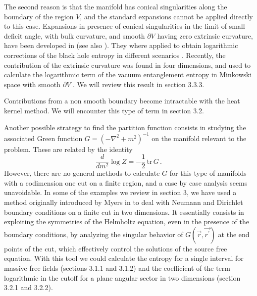 \documentclass[11pt]{article}
\begin{document}
The second reason is that the manifold has conical singularities along the boundary of the region $V$, and the standard expansions cannot be applied directly to this case. Expansions in presence of conical singularities in the limit of small deficit angle, with bulk curvature, and smooth $\partial V$ having zero extrinsic curvature, have been developed in \cite{dos} (see also \cite{dt}). They where applied to obtain logarithmic corrections of the black hole entropy in different scenarios  \cite{dos,cases}. Recently, the contribution of the extrinsic curvature was found in four dimensions, and used to calculate the logarithmic term of the vacuum entanglement entropy  in Minkowski space with smooth $\partial V$ \cite{una}. We will review this result in section 3.3.3.     

Contributions from a non smooth boundary become intractable with the heat kernel method. We will encounter this type of term in section 3.2. 

Another possible strategy to find the partition function consists in studying the associated Green function $G=(-\nabla^2+m^2)^{-1}$ on the manifold relevant to the problem. These are related by the identity
\begin{equation}
\frac{d}{dm^2}\log Z= -\frac{1}{2}\,\textrm{tr}  \, G\,.
\end{equation} 
 However, there are no general methods to calculate $G$ for this type of manifolds with a codimension one cut on a finite region, and a case by case analysis seems unavoidable. In some of the examples we review in section 3, we have used a method originally introduced by Myers in \cite{Myers} to deal with Neumann and Dirichlet boundary conditions on a finite cut in two dimensions. It essentially consists in exploiting the symmetries of the Helmholtz equation, even in the presence of the boundary conditions, by analyzing the singular behavior of $G(\vec r,\vec{r^{\prime}})$ at the end points of the cut, which effectively control the solutions of the source free equation. With this tool we could calculate the entropy for a single interval for massive free fields (sections 3.1.1 and 3.1.2) and the coefficient of the term logarithmic in the cutoff for a plane angular sector in two dimensions (section 3.2.1 and 3.2.2). 
\end{document}
